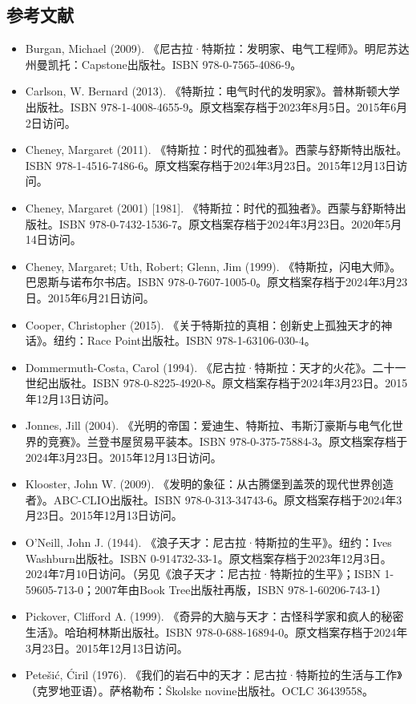\subsection{参考文献}  
\begin{itemize}
\item Burgan, Michael (2009). 《尼古拉·特斯拉：发明家、电气工程师》。明尼苏达州曼凯托：Capstone出版社。ISBN 978-0-7565-4086-9。  
\item Carlson, W. Bernard (2013). 《特斯拉：电气时代的发明家》。普林斯顿大学出版社。ISBN 978-1-4008-4655-9。原文档案存档于2023年8月5日。2015年6月2日访问。  
\item Cheney, Margaret (2011). 《特斯拉：时代的孤独者》。西蒙与舒斯特出版社。ISBN 978-1-4516-7486-6。原文档案存档于2024年3月23日。2015年12月13日访问。  
\item Cheney, Margaret (2001) [1981]. 《特斯拉：时代的孤独者》。西蒙与舒斯特出版社。ISBN 978-0-7432-1536-7。原文档案存档于2024年3月23日。2020年5月14日访问。  
\item Cheney, Margaret; Uth, Robert; Glenn, Jim (1999). 《特斯拉，闪电大师》。巴恩斯与诺布尔书店。ISBN 978-0-7607-1005-0。原文档案存档于2024年3月23日。2015年6月21日访问。
\item Cooper, Christopher (2015). 《关于特斯拉的真相：创新史上孤独天才的神话》。纽约：Race Point出版社。ISBN 978-1-63106-030-4。  
\item Dommermuth-Costa, Carol (1994). 《尼古拉·特斯拉：天才的火花》。二十一世纪出版社。ISBN 978-0-8225-4920-8。原文档案存档于2024年3月23日。2015年12月13日访问。  
\item Jonnes, Jill (2004). 《光明的帝国：爱迪生、特斯拉、韦斯汀豪斯与电气化世界的竞赛》。兰登书屋贸易平装本。ISBN 978-0-375-75884-3。原文档案存档于2024年3月23日。2015年12月13日访问。
\item Klooster, John W. (2009). 《发明的象征：从古腾堡到盖茨的现代世界创造者》。ABC-CLIO出版社。ISBN 978-0-313-34743-6。原文档案存档于2024年3月23日。2015年12月13日访问。  
\item O'Neill, John J. (1944). 《浪子天才：尼古拉·特斯拉的生平》。纽约：Ives Washburn出版社。ISBN 0-914732-33-1。原文档案存档于2023年12月3日。2024年7月10日访问。（另见《浪子天才：尼古拉·特斯拉的生平》；ISBN 1-59605-713-0；2007年由Book Tree出版社再版，ISBN 978-1-60206-743-1）  
\item Pickover, Clifford A. (1999). 《奇异的大脑与天才：古怪科学家和疯人的秘密生活》。哈珀柯林斯出版社。ISBN 978-0-688-16894-0。原文档案存档于2024年3月23日。2015年12月13日访问。  
\item Petešić, Ćiril (1976). 《我们的岩石中的天才：尼古拉·特斯拉的生活与工作》（克罗地亚语）。萨格勒布：Školske novine出版社。OCLC 36439558。  

\end{itemize}
